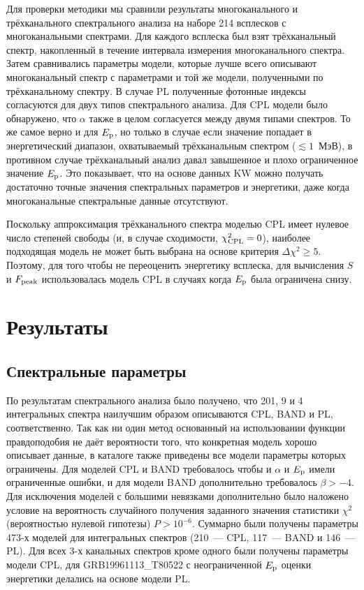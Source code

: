 Для проверки методики мы сравнили результаты многоканального и трёхканального спектрального анализа
на наборе 214 всплесков с многоканальными спектрами.
Для каждого всплеска был взят  трёхканальный спектр, накопленный в течение 
интервала измерения многоканального спектра.
Затем сравнивались параметры модели, которые лучше всего описывают многоканальный спектр
с параметрами и той же модели, полученными по трёхканальному спектру.
В случае PL полученные фотонные индексы согласуются для двух типов
спектрального анализа. Для CPL модели было обнаружено, что  $\alpha$ также в целом
согласуется между двумя типами спектров. То же самое верно и для $E_{\mathrm{p}}$, но
только в случае если значение попадает в энергетический диапазон, охватываемый трёхканальным спектром
($\lesssim 1$~МэВ), в противном случае трёхканальный анализ давал завышенное и 
плохо ограниченное значение $E_{\mathrm{p}}$. Это показывает, что на основе данных KW 
можно получать достаточно точные значения спектральных параметров и энергетики,
даже когда многоканальные спектральные данные отсутствуют.

Поскольку аппроксимация трёхканального спектра моделью CPL имеет нулевое число степеней свободы
(и, в случае сходимости, $\chi_{\mathrm{CPL}}^2=0$), наиболее подходящая модель 
не может быть выбрана на основе критерия $\Delta \chi^2 \geq 5$.
Поэтому, для того чтобы не переоценить энергетику всплеска, для вычисления $S$ и $F_{\mathrm{peak}}$
использовалась модель CPL в случаях когда $E_{\mathrm{p}}$ была ограничена снизу.

\section{Результаты}\label{sec:RESULTS}
\subsection{Спектральные параметры}
По результатам спектрального анализа было получено, что 201, 9 и 4 интегральных 
спектра наилучшим образом описываются CPL, BAND и PL, соответственно. 
Так как ни один метод основанный на использовании функции правдоподобия не даёт 
вероятности того, что конкретная модель хорошо описывает данные, в каталоге также приведены все 
модели параметры которых ограничены.
Для моделей CPL и BAND требовалось чтобы и $\alpha$ и $E_{\mathrm{p}}$ имели ограниченные ошибки,
и для модели BAND дополнительно требовалось $\beta > -4$. Для исключения моделей
с большими невязками дополнительно было наложено условие на вероятность 
случайного получения заданного значения статистики $\chi^2$ 
(вероятностью нулевой гипотезы) $P> 10^{-6}$. 
Суммарно были получены параметры 473-х моделей
для интегральных спектров (210~--- CPL, 117~--- BAND и 146~--- PL).
Для всех 3-х канальных спектров кроме одного были получены параметры модели CPL, для GRB19961113\_T80522 с 
неограниченной $E_{\mathrm{p}}$ оценки энергетики делались на основе модели PL. 


